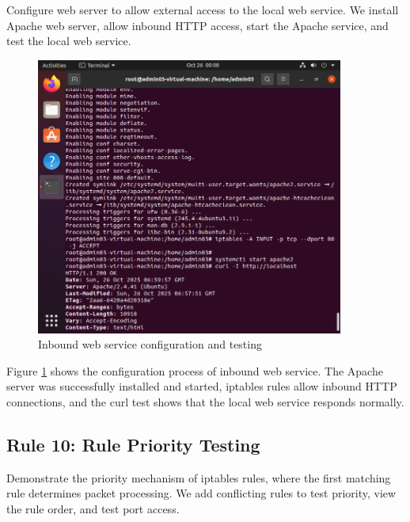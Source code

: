 \documentclass[12pt,a4paper]{article}
\begin{document}
Configure web server to allow external access to the local web service. We install Apache web server, allow inbound HTTP access, start the Apache service, and test the local web service.

\begin{figure}[H]
    \centering
    \includegraphics[width=0.9\textwidth]{10_inbound_web.png}
    \caption{Inbound web service configuration and testing}
    \label{fig:inbound_web}
\end{figure}

Figure \ref{fig:inbound_web} shows the configuration process of inbound web service. The Apache server was successfully installed and started, iptables rules allow inbound HTTP connections, and the curl test shows that the local web service responds normally.

\subsection{Rule 10: Rule Priority Testing}

Demonstrate the priority mechanism of iptables rules, where the first matching rule determines packet processing. We add conflicting rules to test priority, view the rule order, and test port access.
\end{document}
